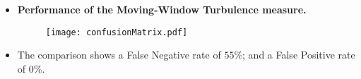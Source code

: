 \documentclass{beamer}
\begin{document}
\begin{frame}{}{}
	\vspace*{-0.2 in}
	\begin{itemize}
		\vspace{-0 in}
		\item{\textbf{Performance of the Moving-Window Turbulence measure.}}
		\vspace{-1.4 in}
		\begin{figure}
			\scalebox{1}
			{\hspace*{-1.5 in}\texttt{[image: confusionMatrix.pdf]} }
		\end{figure}
	\vspace*{-8.2in}
		\item{The comparison shows a False Negative rate of $55$\%; and a False Positive rate of $0$\%.}
	\end{itemize}
\end{frame}


%
%
\end{document}
